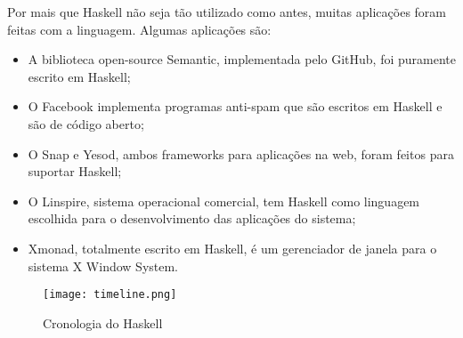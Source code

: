     Por mais que Haskell não seja tão utilizado como antes, muitas aplicações foram feitas com a linguagem. 
    Algumas aplicações são:

    \begin{itemize}
      \item A biblioteca open-source Semantic, implementada pelo GitHub, foi puramente escrito em Haskell;
      \item O Facebook implementa programas anti-spam que são escritos em Haskell e são de código aberto;
      \item O Snap e Yesod, ambos frameworks para aplicações na web, foram feitos para suportar Haskell;
      \item O Linspire, sistema operacional comercial, tem Haskell como linguagem escolhida para o desenvolvimento das aplicações do sistema;
      \item Xmonad, totalmente escrito em Haskell, é um gerenciador de janela para o sistema X Window System.
    \end{itemize}

    \begin{figure}[ht]
      \centering
      \caption{Cronologia do Haskell}
      \texttt{[image: timeline.png]}
    \end{figure}

    \nocite{haskellmicrosoft}
    \nocite{haskellreport2010}
    \nocite{haskelljobs}
    \nocite{haskellers}

    \newpage